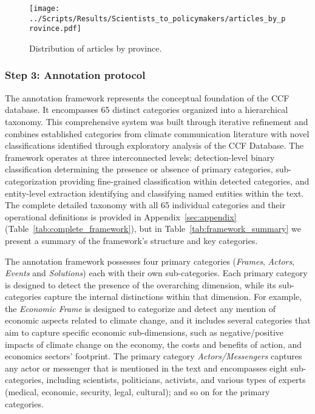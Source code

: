 \documentclass[12pt]{article}
\begin{document}
\begin{figure}[!htbp]
  \centering
  \texttt{[image: ../Scripts/Results/Scientists\_to\_policymakers/articles\_by\_province.pdf]}
  \caption{Distribution of articles by province.}
  \label{fig:province_dist}
  \end{figure}

\subsubsection{Step 3: Annotation protocol}

The annotation framework represents the conceptual foundation of the CCF database. It encompasses 65 distinct categories organized into a hierarchical taxonomy. This comprehensive system was built through iterative refinement and combines established categories from climate communication literature with novel classifications identified through exploratory analysis of the CCF Database. The framework operates at three interconnected levels: detection-level binary classification determining the presence or absence of primary categories, sub-categorization providing fine-grained classification within detected categories, and entity-level extraction identifying and classifying named entities within the text. The complete detailed taxonomy with all 65 individual categories and their operational definitions is provided in Appendix~\ref{sec:appendix} (Table~\ref{tab:complete_framework}), but in Table~\ref{tab:framework_summary} we present a summary of the framework's structure and key categories.

The annotation framework possesses four primary categories (\emph{Frames}, \emph{Actors}, \emph{Events} and \emph{Solutions}) each with their own sub-categories. Each primary category is designed to detect the presence of the overarching dimension, while its sub-categories capture the internal distinctions within that dimension. For example, the \emph{Economic Frame} is designed to categorize and detect any mention of economic aspects related to climate change, and it includes several categories that aim to capture specific economic sub-dimensions, such as negative/positive impacts of climate change on the economy, the costs and benefits of action, and economics sectors' footprint. The primary category \emph{Actors/Messengers} captures any actor or messenger that is mentioned in the text and encompasses eight sub-categories, including scientists, politicians, activists, and various types of experts (medical, economic, security, legal, cultural); and so on for the primary categories. 
\end{document}
